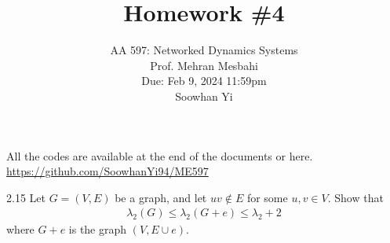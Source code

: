 \documentclass{article}
\begin{document}
\setcounter{problem}{0}
\title{Homework \#4}
\author{
    \normalsize{AA 597: Networked Dynamics Systems}\\
    \normalsize{Prof. Mehran Mesbahi}\\
    \normalsize{Due: Feb 9, 2024 11:59pm}\\
    \normalsize{Soowhan Yi}
}
\date{{}}
\maketitle

All the codes are available at the end of the documents or here.
\url{https://github.com/SoowhanYi94/ME597}
\begin{problem}2.15
    Let $G = (V, E)$ be a graph, and let $uv \notin E$ for some $u, v \in V$. Show that
    \begin{align*}
        \lambda_2 (G) \leq \lambda_2(G+e) \leq \lambda_2 + 2
    \end{align*}
    where $G + e$ is the graph $(V, E \cup {e})$.


\end{problem}
\end{document}
